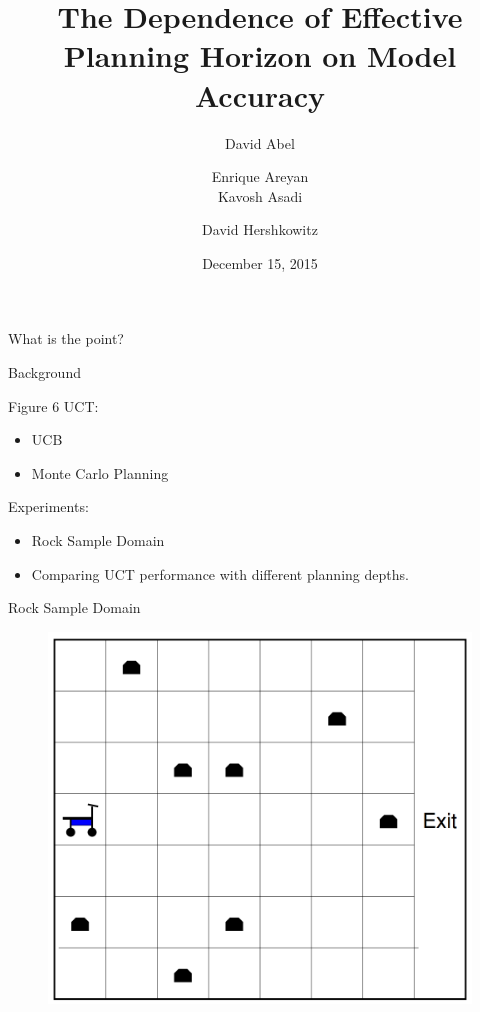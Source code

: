 \documentclass{beamer}
\title[The Dependence of Planning Horizon on Model Accuracy]{The Dependence of Effective Planning Horizon on Model Accuracy}
\author[]{David Abel  \and Enrique Areyan \\ Kavosh Asadi  \and David Hershkowitz}
\date{December 15, 2015}
\begin{document}
\begin{frame}
\titlepage
\end{frame}


\begin{frame}{What is the point?}

\end{frame}


\begin{frame}{Background}

\end{frame}


\begin{frame}{Figure 6}
UCT: 
\begin{itemize}
\item UCB
\item Monte Carlo Planning
\end{itemize}

Experiments:
\begin{itemize}
\item Rock Sample Domain
\item Comparing UCT performance with different planning depths.
\end{itemize}
\end{frame}

\begin{frame}{Rock Sample Domain}

\begin{figure}
\includegraphics[page=1,height=.55\textheight,width=.5\textwidth]{rock_sample_domain.png}
\end{figure}


\end{frame}
\end{document}
